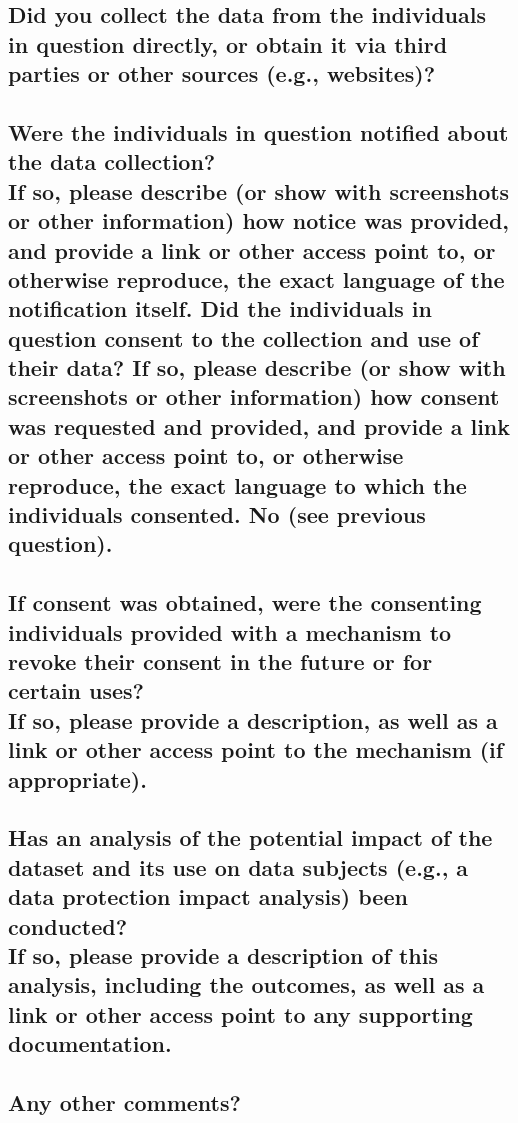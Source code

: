 \documentclass[letterpaper, 10 pt, conference]{ieeeconf}  %
\newcommand{\subtitle}[1]{{\\ \small \normalfont \color{purple} #1}}
\begin{document}
\lipsum[1]

\subsection{Did you collect the data from the individuals in question directly, or obtain it via third parties or other sources (e.g., websites)?}

\lipsum[1]

\subsection{Were the individuals in question notified about the data collection? \subtitle{If so, please describe (or show with screenshots or other information) how notice was provided, and provide a link or other access point to, or otherwise reproduce, the exact language of the notification itself. Did the individuals in question consent to the collection and use of their data? If so, please describe (or show with screenshots or other information) how consent was requested and provided, and provide a link or other access point to, or otherwise reproduce, the exact language to which the individuals consented. No (see previous question).}}

\lipsum[1]

\subsection{If consent was obtained, were the consenting individuals provided with a mechanism to revoke their consent in the future or for certain uses? \subtitle{If so, please provide a description, as well as a link or other access point to the mechanism (if appropriate).}}
\lipsum[1]

\subsection{Has an analysis of the potential impact of the dataset and its use on data subjects (e.g., a data protection impact analysis) been conducted? \subtitle{If so, please provide a description of this analysis, including the outcomes, as well as a link or other access point to any supporting documentation.}}
\lipsum[1]

\subsection{Any other comments?}
\lipsum[1]
\end{document}
